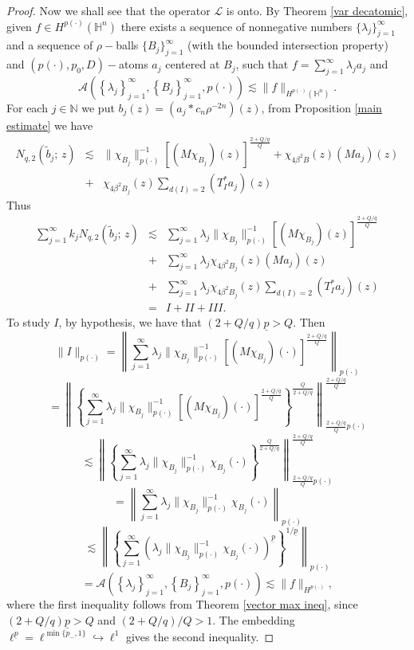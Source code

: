 \documentclass[oneside,10pt]{article}
\begin{document}
\begin{proof}
Now we shall see that the operator $\mathcal{L}$ is onto. By Theorem \ref{var decatomic}, given $f \in H^{p(\cdot)}(\mathbb{H}^{n})$ there exists a sequence of nonnegative numbers $\{ \lambda_j \}_{j=1}^{\infty}$ and a sequence of $\rho-$balls $\{B_j \}_{j=1}^{\infty}$ (with the bounded intersection property) and $(p(\cdot), p_0, D)-$atoms $a_j$ centered at $B_j$, such that $f= \sum_{j=1}^{\infty} \lambda_j a_j$ and
\[
\mathcal{A}\left( \left\{ \lambda_{j}\right\}_{j=1}^{\infty },\left\{ B_{j}\right\} _{j=1}^{\infty },  p(\cdot)\right) 
\lesssim \|f \|_{H^{p(\cdot)}(\mathbb{H}^{n})}.
\]
For each $j \in \mathbb{N}$ we put
$b_j(z)= (a_j \ast c_n \rho^{-2n})(z)$, from Proposition \ref{main estimate} we have
\begin{eqnarray*} 
\label{N estimate}
N_{q, 2} \left(\widetilde{b}_j; \, z \right) &\lesssim& \| \chi_{B_j} \|_{p(\cdot)}^{-1} \left[(M \chi_{B_j})(z) \right]^{\frac{2 + Q/q}{Q}} + \chi_{4 \beta^2 B}(z) (M a_j)(z)  \\
&+& \chi_{4 \beta^2 B_j}(z) \sum_{d(I)=2} (T^{*}_{I} a_j)(z)
\end{eqnarray*}
Thus
\begin{eqnarray*}
\sum_{j=1}^{\infty} k_j N_{q, 2} \left(\widetilde{b}_j; \, z \right) &\lesssim& \sum_{j=1}^{\infty} \lambda_j 
\| \chi_{B_j} \|_{p(\cdot)}^{-1} 
\left[(M \chi_{B_j})(z) \right]^{\frac{2 + Q/q}{Q}} \\
&+& \sum_{j=1}^{\infty} \lambda_j \chi_{4 \beta^2 B_j}(z) (M a_j)(z) \\
&+& \sum_{j=1}^{\infty} \lambda_j \chi_{4 \beta^2 B_j}(z) \sum_{d(I)=2} (T^{*}_{I} a_j)(z) \\
&=& I + II + III.
\end{eqnarray*}
To study $I$, by hypothesis, we have that $(2 + Q/q) \underline{p} > Q $. Then
\[
\|I\|_{p(\cdot)} = \left\| \sum_{j=1}^{\infty} \lambda_j \| \chi_{B_j} \|_{p(\cdot)}^{-1} 
\left[(M\chi_{B_j})(\cdot) \right]^{\frac{2 + Q/q}{Q}} \right\|_{p(\cdot)}
\]
\[
= \left\| \left\{ \sum_{j=1}^{\infty} \lambda_j \| \chi_{B_j} \|_{p(\cdot)}^{-1} \left[(M\chi_{B_j})(\cdot) \right]^{\frac{2 + Q/q}{Q}} \right\}^{\frac{Q}{2 + Q/q}} \right\|_{\frac{2 + Q/q}{Q}p(\cdot)}^{\frac{2 + Q/q}{Q}}
\]
\[
\lesssim \left\| \left\{ \sum_{j=1}^{\infty} \lambda_j \| \chi_{B_j} \|_{p(\cdot)}^{-1} \chi_{B_j}(\cdot)  \right\}^{\frac{Q}{2 + Q/q}} \right\|_{\frac{2 + Q/q}{Q}p(\cdot)}^{\frac{2 + Q/q}{Q}}
\]
\[
= \left\| \sum_{j=1}^{\infty} \lambda_j \| \chi_{B_j} \|_{p(\cdot)}^{-1} 
\chi_{B_j}(\cdot) \right\|_{p(\cdot)}
\]
\[
\lesssim \left\| \left\{ \sum_{j=1}^{\infty} \left( \lambda_j \| \chi_{B_j} \|_{p(\cdot)}^{-1} \chi_{B_j}(\cdot) \right)^{\underline{p}}  \right\}^{1/ \underline{p}} \right\|_{p(\cdot)} 
\]
\[
= \mathcal{A}\left( \left\{ \lambda_{j}\right\}_{j=1}^{\infty },\left\{ B_{j}\right\} _{j=1}^{\infty }, p(\cdot)\right)
\lesssim \|f \|_{H^{p(\cdot)}},
\]
where the first inequality follows from Theorem \ref{vector max ineq}, since $(2 + Q/q) \underline{p} > Q $ and $(2+ Q/q)/Q > 1$. The embedding 
$\ell^{\underline{p}} = \ell^{\min \{ p_{-}, 1 \}} \hookrightarrow \ell^{1}$ gives the second inequality.


\end{proof}
\end{document}
